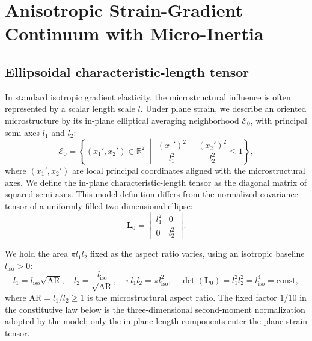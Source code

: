 \section{Anisotropic Strain-Gradient Continuum with Micro-Inertia}
\label{sec:continuum}

\subsection{Ellipsoidal characteristic-length tensor}
In standard isotropic gradient elasticity, the microstructural influence is often represented by a scalar length scale $l$. Under plane strain, we describe an oriented microstructure by its in-plane elliptical averaging neighborhood $\mathcal{E}_0$, with principal semi-axes $l_1$ and $l_2$:
\begin{equation}
\mathcal{E}_0 = \left\{ (x_1', x_2') \in \mathbb{R}^2 \;\middle|\; \frac{(x_1')^2}{l_1^2} + \frac{(x_2')^2}{l_2^2} \le 1 \right\},
\label{eq:ellipse_def}
\end{equation}
where $(x_1', x_2')$ are local principal coordinates aligned with the microstructural axes. We define the in-plane characteristic-length tensor as the diagonal matrix of squared semi-axes. This model definition differs from the normalized covariance tensor of a uniformly filled two-dimensional ellipse:
\begin{equation}
\mathbf{L}_0 = \begin{bmatrix} l_1^2 & 0 \\ 0 & l_2^2 \end{bmatrix}.
\label{eq:L0_mat}
\end{equation}

We hold the area $\pi l_1l_2$ fixed as the aspect ratio varies, using an isotropic baseline $l_{\mathrm{iso}}>0$:
\begin{equation}
l_1 = l_{\mathrm{iso}}\sqrt{\mathrm{AR}}, \quad l_2 = \frac{l_{\mathrm{iso}}}{\sqrt{\mathrm{AR}}}, \quad \pi l_1l_2 = \pi l_{\mathrm{iso}}^2, \quad \det(\mathbf{L}_0) = l_1^2l_2^2 = l_{\mathrm{iso}}^4 = \mathrm{const},
\label{eq:volume_equivalent}
\end{equation}
where $\mathrm{AR} = l_1/l_2 \ge 1$ is the microstructural aspect ratio. The fixed factor $1/10$ in the constitutive law below is the three-dimensional second-moment normalization adopted by the model; only the in-plane length components enter the plane-strain tensor.

